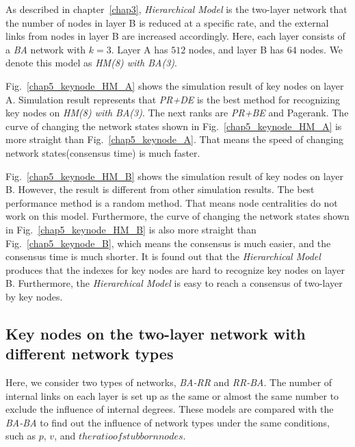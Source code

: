 As described in chapter~\ref{chap3}, \textit{Hierarchical Model} is the two-layer network that the number of nodes in layer B is reduced at a specific rate, and the external links from nodes in layer B are increased accordingly. Here, each layer consists of a \textit{BA} network with $k=3$. Layer A has $512$ nodes, and layer B has $64$ nodes. We denote this model as \textit{HM(8) with BA(3)}.

Fig.~\ref{chap5_keynode_HM_A} shows the simulation result of key nodes on layer A. Simulation result represents that \textit{PR+DE} is the best method for recognizing key nodes on \textit{HM(8) with BA(3)}. The next ranks are \textit{PR+BE} and Pagerank. The curve of changing the network states shown in Fig.~\ref{chap5_keynode_HM_A} is more straight than Fig.~\ref{chap5_keynode_A}. That means the speed of changing network states(consensus time) is much faster. 

Fig.~\ref{chap5_keynode_HM_B} shows the simulation result of key nodes on layer B. However, the result is different from other simulation results. The best performance method is a random method. That means node centralities do not work on this model. Furthermore, the curve of changing the network states shown in Fig.~\ref{chap5_keynode_HM_B} is also more straight than Fig.~\ref{chap5_keynode_B}, which means the consensus is much easier, and the consensus time is much shorter. It is found out that the \textit{Hierarchical Model} produces that the indexes for key nodes are hard to recognize key nodes on layer B. Furthermore, the \textit{Hierarchical Model} is easy to reach a consensus of two-layer by key nodes. \\

\subsection{Key nodes on the two-layer network with different network types}
Here, we consider two types of networks, \textit{BA-RR} and \textit{RR-BA}. The number of internal links on each layer is set up as the same or almost the same number to exclude the influence of internal degrees. These models are compared with the \textit{BA-BA} to find out the influence of network types under the same conditions, such as $p$, $v$, and $the ratio of stubborn nodes$.  

